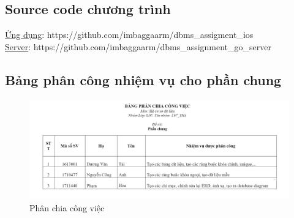 \documentclass[12pt,a4paper,titlepage]{article}
\begin{document}
\subsection{Source code chương trình}
\href{https://github.com/imbaggaarm/dbms_assigment_ios}{Ứng dụng}: https://github.com/imbaggaarm/dbms_assigment_ios\\
\href{https://github.com/imbaggaarm/dbms_assignment_go_server}{Server}: https://github.com/imbaggaarm/dbms_assignment_go_server
\subsection{Bảng phân công nhiệm vụ cho phần chung}
\begin{figure}[h!]
	\centering
	\caption{Phân chia công việc}
	\includegraphics[width=1.0\textwidth]{images/pccv.png}
\end{figure}
\end{document}
